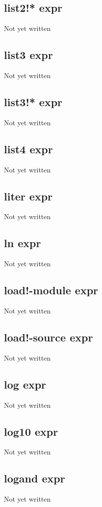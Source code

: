 \documentclass[a4paper,11pt]{article}
\begin{document}
{\subsection{\ttfamily list2!* expr}
Not yet written

\subsection{\ttfamily list3 expr}
Not yet written

\subsection{\ttfamily list3!* expr}
Not yet written

\subsection{\ttfamily list4 expr}
Not yet written

\subsection{\ttfamily liter expr}
Not yet written

\subsection{\ttfamily ln expr}
Not yet written

\subsection{\ttfamily load!-module expr}
Not yet written

\subsection{\ttfamily load!-source expr}
Not yet written

\subsection{\ttfamily log expr}
Not yet written

\subsection{\ttfamily log10 expr}
Not yet written

\subsection{\ttfamily logand expr}
Not yet written

}
\end{document}
